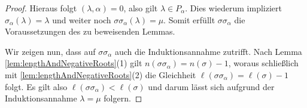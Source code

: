 \begin{proof}
  Hieraus folgt $(\lambda, \alpha) = 0$, also gilt $\lambda \in P_\alpha$.
  Dies wiederum impliziert $\sigma_\alpha(\lambda) = \lambda$ und weiter noch $\sigma \sigma_\alpha(\lambda) = \mu$.
  Somit erfüllt $\sigma \sigma_\alpha$ die Voraussetzungen des zu beweisenden Lemmas. 

  Wir zeigen nun, dass auf $\sigma \sigma_\alpha$ auch die Induktionsannahme zutrifft.
  Nach Lemma \ref{lem:lengthAndNegativeRoots}(1) gilt $n(\sigma\sigma_\alpha) = n(\sigma) - 1$, woraus schließlich mit \ref{lem:lengthAndNegativeRoots}(2) die Gleichheit $\ell(\sigma\sigma_\alpha) = \ell(\sigma) - 1$ folgt.
  Es gilt also $\ell(\sigma\sigma_\alpha) < \ell(\sigma)$ und darum lässt sich aufgrund der Induktionsannahme $\lambda = \mu$ folgern.
\end{proof}

